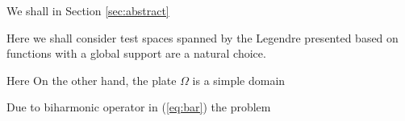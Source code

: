 \documentclass{marine_2015}
\newcommand{\deriv}[2]{\ensuremath{\frac{\mathrm{d}#1}{\mathrm{d}#2}}}
\begin{document}
We shall in Section \ref{sec:abstract} 

Here we
shall consider test spaces spanned by the Legendre presented
based on functions with a global support are a natural choice. 

% 

Here On the other hand, the plate $\Omega$ is a simple domain


Due to biharmonic operator in (\ref{eq:bar}) the problem 
\end{document}
